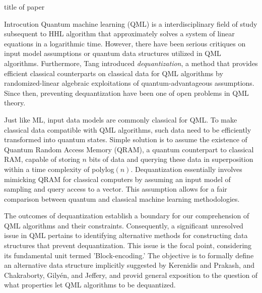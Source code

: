 \documentclass[10pt,twoside,reqno]{amsart} %
\makeatletter
\renewcommand{\section}{\@startsection{section}{1}
   \z@{.7\linespacing\@plus\linespacing}{.5\linespacing}
   {\normalfont\upshape\bfseries\centering}}
\theoremstyle{plain}
\theoremstyle{definition}
\makeatother
\begin{document}
\pagestyle{myheadings}
         {\centerline {\scriptsize  title of paper  }}


\bigskip
\section{Introcution}
Quantum machine learning (QML) is a interdisciplinary field of study subsequent
to HHL algorithm \cite{harrow2009} that approximately solves a system of linear
equations in a logarithmic time. However, there have been serious critiques 
\cite{aaronson2015} on input model assumptions or quantum data structures
utilized in QML algorithms. Furthermore, Tang \cite{tang2019} introduced 
\emph{dequantization}, a method that provides efficient classical counterparts
on classical data for QML algorithms by randomized-linear algebraic exploitations
of quantum-advantageous assumptions. Since then, preventing dequantization
have been one of open problems \cite{tang2023} in QML theory.


Just like ML, input data models are commonly classical for QML. To make classical
data compatible with QML algorithms, such data need to be efficiently transformed
into quantum states. Simple solution is to assume the existence of Quantum 
Random Access Memory (QRAM), a quantum counterpart to classical RAM, capable of
storing $n$ bits of data and querying these data in superposition within a time
complexity of polylog$(n)$. Dequantization essentially involves
mimicking QRAM for classical computers by assuming an input model of sampling
and query access to a vector. This assumption allows for a fair comparison
between quantum and classical machine learning methodologies.

The outcomes of dequantization establish a boundary for our comprehension of QML
algorithms and their constraints. Consequently, a significant unresolved issue
in QML pertains to identifying alternative methods for constructing data 
structures that prevent dequantization. This issue is the focal point, 
considering its fundamental unit termed 'Block-encoding.' The objective is to
formally define an alternative data structure implicitly suggested by Kerenidis
and Prakash, and Chakraborty, Gilyén, and Jeffery, and provid general exposition
to the question of what properties let QML algorithms to be dequantized.
\end{document}
